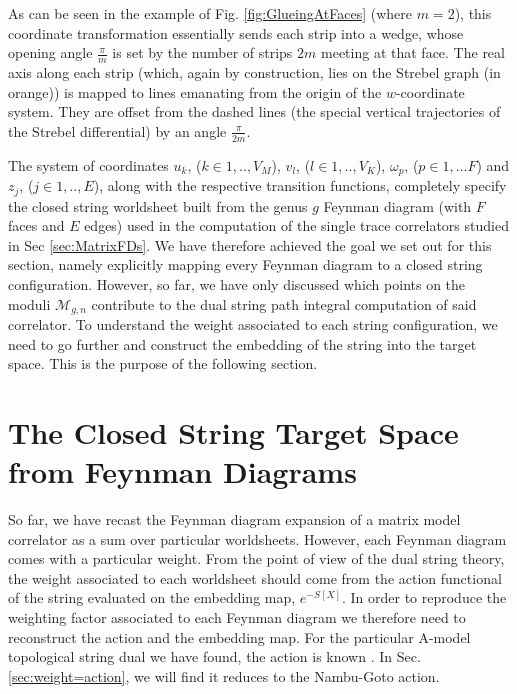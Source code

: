 \documentclass[english]{article}
\renewcommand{\>}{\rangle}
\newcommand{\<}{\langle}
\newcommand{\w}{\omega}
\renewcommand{\(}{\left(}
\renewcommand{\)}{\right)}
\begin{document}
As can be seen in the example of Fig. \ref{fig:GlueingAtFaces} (where $m=2$), this coordinate transformation essentially sends each strip into a wedge, whose opening angle $\frac{\pi}{m}$ is set by the number of strips $2m$ meeting at that face. The real axis along each strip (which, again by construction, lies on the Strebel graph (in orange)) is mapped to lines emanating from the origin of the $w$-coordinate system. They are offset from the dashed lines (the special vertical trajectories of the Strebel differential) by an angle $\frac{\pi}{2m}$.


The system of coordinates $u_{k}$, ($k \in 1,..,V_{M}$), $v_{l}$, ($l \in 1,..,V_{K}$), $\w_p$, ($p \in 1,...F$) and $z_{j}$, ($j \in 1,..,E$), along with the respective transition functions, completely specify the closed string worldsheet built from the genus $g$ Feynman diagram (with $F$ faces and $E$ edges) used in the computation of the single trace correlators studied in Sec \ref{sec:MatrixFDs}. We have therefore achieved the goal we set out for this section, namely explicitly mapping every Feynman diagram to a closed string configuration. However, so far, we have only discussed which points on the moduli $\mathcal{M}_{g,n}$ contribute to the dual string path integral computation of said correlator. To understand the weight associated to each string configuration, we need to go further and construct the embedding of the string into the target space. This is the purpose of the following section.  




\pagebreak


\section{The Closed String Target Space from Feynman Diagrams}\label{sec:targetpersp}

So far, we have recast the Feynman diagram expansion of a matrix model correlator as a sum over particular worldsheets. However, each Feynman diagram comes with a particular weight. From the point of view of the dual string theory, the weight associated to each worldsheet should come from the action functional of the string evaluated on the embedding map, $e^{-S[X]}$. In order to reproduce the weighting factor associated to each Feynman diagram we therefore need to reconstruct the action and the embedding map. For the particular A-model topological string dual we have found, the action is known \cite{WittenTopSigma,MarinoAmodelreview}. In Sec. \ref{sec:weight=action}, we will find it reduces to the Nambu-Goto action.
\end{document}
